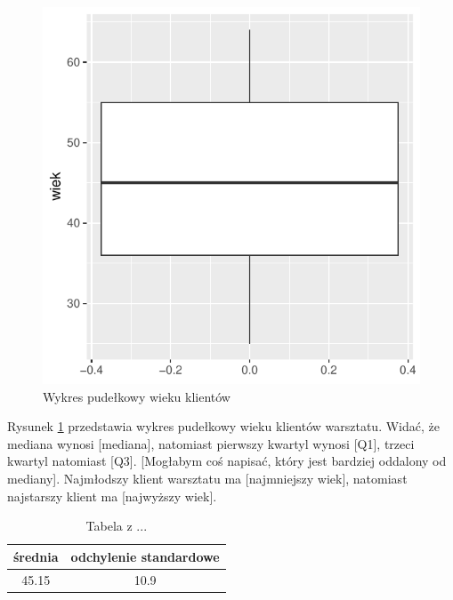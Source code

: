 \documentclass{article}\usepackage[]{graphicx}\usepackage[]{xcolor}
\makeatletter
\def\maxwidth{ %
  \ifdim\Gin@nat@width>\linewidth
    \linewidth
  \else
    \Gin@nat@width
  \fi
}
\newenvironment{knitrout}{}{} %
\makeatother
\begin{document}
\begin{knitrout}
\color{fgcolor}\begin{figure}
\includegraphics[width=\maxwidth]{figure/fig_wiek-1} \caption[Wykres pudełkowy wieku klientów]{Wykres pudełkowy wieku klientów}\label{fig:fig_wiek}
\end{figure}

\end{knitrout}

Rysunek \ref{fig:fig_wiek} przedstawia wykres pudełkowy wieku klientów warsztatu. Widać, że mediana wynosi [mediana], natomiast pierwszy kwartyl wynosi {\color{red}[Q1]}, trzeci kwartyl natomiast {\color{red}[Q3]}. {\color{red}[Mogłabym coś napisać, który jest bardziej oddalony od mediany]}. Najmłodszy klient warsztatu ma {\color{red}[najmniejszy wiek]}, natomiast najstarszy klient ma {\color{red}[najwyższy wiek]}.

\begin{table}[H]
\centering
\begin{tabular}{|c|c|} \hline
średnia & odchylenie standardowe \\ \hline
45.15 & 10.9 \\ \hline
\end{tabular}
\caption{Tabela z ...}
\label{tab_wiek}
\end{table}
\end{document}
